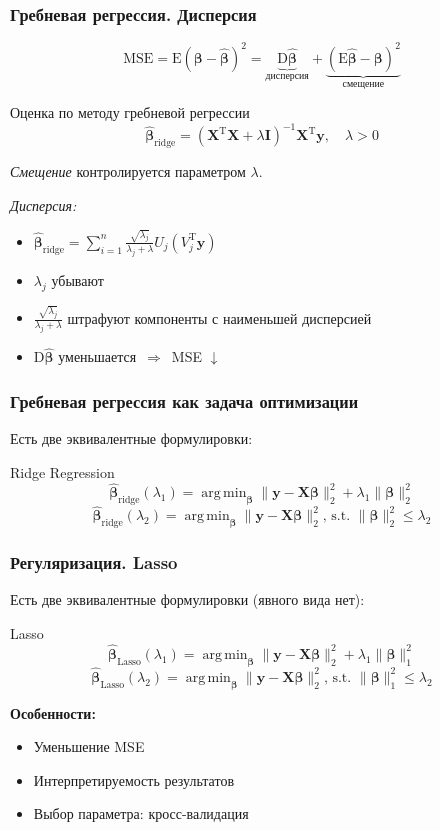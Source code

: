 \documentclass[ucs, notheorems, handout]{beamer}
\DeclareMathOperator*{\argmin}{arg\,min}
\newcommand{\betah}{\hat{\bm \beta}}
\newcommand{\betaa}{\bm{\beta}}
\newcommand{\E}{\mathrm{E}}
\newcommand{\D}{\mathrm{D}}
\newcommand{\XT}{{\bm{X}}^{\mathrm{T}}}
\newcommand{\X}{\bm{X}}
\begin{document}
	\begin{frame}
	    \frametitle{Гребневая регрессия. Дисперсия}
	$$\mathrm{MSE} = \E(\betaa - \betah)^2 = \underbrace{\mathrm D \betah}_{\text{дисперсия}} + \underbrace{(\mathrm E \betah - \betaa)^2}_{\text{смещение}}$$
	
	\begin{block}{Оценка по методу гребневой регрессии}
	$$\betah_{\text{ridge}} = (\XT \X + \lambda \mathbf I)^{-1}\XT\bm y,\quad \lambda > 0$$
	\end{block}	
	
	\textit{Смещение} контролируется параметром $\lambda$.
		
		\textit{Дисперсия:}
		
		\begin{itemize}
			\item $\betah_{\text{ridge}} = \sum_{i = 1}^n \frac{\sqrt{\lambda_j}}{\lambda_j + \lambda} U_j(V_j^\mathrm T\bm y)$
			\item $\lambda_j$ убывают
			\item $\frac{\sqrt{\lambda_j}}{\lambda_j + \lambda}$ штрафуют компоненты с наименьшей дисперсией
			\item  $\D \betah$ уменьшается $\, \Rightarrow \,$  MSE $\downarrow$
		\end{itemize}
		
	
	    \note{
		
	    }
	\end{frame}
	
	\begin{frame}
	    \frametitle{Гребневая регрессия как задача оптимизации}
	Есть две эквивалентные формулировки:
	\begin{block}{Ridge Regression}
	$$\betah_{\text{ridge}}(\lambda_1) = \argmin_{\betaa}{\|\bm y - \X\betaa\|^2_2 +\lambda_1 \|\betaa\|^2_2}
	$$
	$$
	\betah_{\text{ridge}}(\lambda_2) = \argmin_{\betaa}{\|\bm y - \X\betaa\|^2_2 \text{, s.t. } \|\betaa\|^2_2 \leqslant \lambda_2}
	$$
	\end{block}	
	
	\end{frame}

	
	\begin{frame}
	    \frametitle{Регуляризация. Lasso}
	Есть две эквивалентные формулировки (явного вида нет):
	\begin{block}{Lasso}
	$$\betah_{\text{Lasso}}(\lambda_1) = \argmin_{\betaa}{\|\bm y - \X\betaa\|^2_2 +\lambda_1 \|\betaa\|^2_1}
	$$
	$$
	\betah_{\text{Lasso}}(\lambda_2) = \argmin_{\betaa}{\|\bm y - \X\betaa\|^2_2 \text{, s.t. } \|\betaa\|^2_1 \leqslant \lambda_2}
	$$
	\end{block}	
	\textbf{
	Особенности:
	}
	\begin{itemize}
		\item Уменьшение MSE
		\item Интерпретируемость результатов
		\item Выбор параметра: кросс-валидация
	\end{itemize}
	    \note{
	    }
	\end{frame}
	
\end{document}
